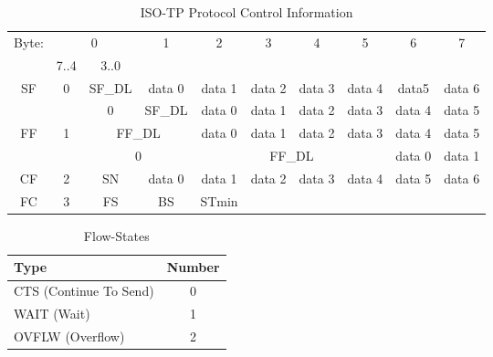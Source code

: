 \begin{table}
	\centering
	\caption{ISO-TP Protocol Control Information}
	\begin{tabular}{|c|c|c|c|c|c|c|c|c|c|} \hline
	Byte:                 & \multicolumn{2}{c|}{0}              & \multirow{2}{*}{1}  & \multirow{2}{*}{2} & \multirow{2}{*}{3} & \multirow{2}{*}{4} & \multirow{2}{*}{5} & \multirow{2}{*}{6} & \multirow{2}{*}{7} \\ \cline{2-3}
	                      & 7..4               & 3..0           &                     &                    &                    &                    &                    &                    &                    \\ \hline \hline
	\multirow{2}{*}{SF}   & \multirow{2}{*}{0} & SF\_DL         & data 0              & data 1             & data 2             & data 3             & data 4             & data5              & data 6             \\ \cline{3-10}
	                      &                    & 0              & SF\_DL              & data 0             & data 1             & data 2             & data 3             & data 4             & data 5             \\ \hline
	\multirow{2}{*}{FF}   & \multirow{2}{*}{1} & \multicolumn{2}{c|}{FF\_DL}          & data 0             & data 1             & data 2             & data 3             & data 4             & data 5             \\ \cline{3-10}
	                      &                    & \multicolumn{2}{c|}{0}               & \multicolumn{4}{c|}{FF\_DL}                                                       & data 0             & data 1             \\ \hline
	CF                    & 2                  & SN             & data 0              & data 1             & data 2             & data 3             & data 4             & data 5             & data 6             \\ \hline
	FC                    & 3                  & FS             & BS                  & STmin              & \multicolumn{5}{c|}{}                                                                                  \\ \hline
	\end{tabular}
	\label{tab:pci}
\end{table}

\begin{table}
	\centering
	\caption{Flow-States}
	\begin{tabular}{|l|c|} \hline
	Type  & Number \\ \hline \hline
	CTS   (Continue To Send)  & 0      \\ \hline
	WAIT  (Wait)              & 1      \\ \hline
	OVFLW (Overflow)          & 2      \\ \hline
	\end{tabular}
	\label{tab:fs}
\end{table}

